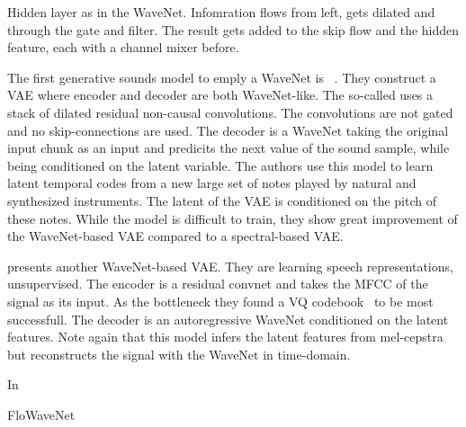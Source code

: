 \begin{marginfigure}
    
    \caption{Hidden layer as in the WaveNet. Infomration flows from left, gets dilated and through the gate and filter. The result gets added to the skip flow and the hidden feature, each with a channel mixer before.}%
    \label{fig:wavenet_layer}
\end{marginfigure}


The first generative sounds model to emply a WaveNet is ~\cite{kalchbrennerEfficient2018}. They construct a VAE where encoder and decoder are both WaveNet-like. The so-called  uses a stack of dilated residual non-causal convolutions. The convolutions are not gated and no skip-connections are used. The decoder is a WaveNet taking the original input chunk as an input and predicits the next value of the sound sample, while being conditioned on the latent variable. The authors use this model to learn latent temporal codes from a new large set of notes played by natural and synthesized instruments. The latent of the VAE is conditioned on the pitch of these notes. While the model is difficult to train, they show great improvement of the WaveNet-based VAE compared to a spectral-based VAE.

\textcite{chorowskiUnsupervised2019} presents another WaveNet-based VAE. They are learning speech representations, unsupervised. The encoder is a residual convnet and takes the MFCC of the signal as its input. As the bottleneck they found a VQ codebook~\cite{vandenoordNeural2017} to be most successfull. The decoder is an autoregressive WaveNet conditioned on the latent features. Note again that this model infers the latent features from mel-cepstra but reconstructs the signal with the WaveNet in time-domain.

In~\cite{prengerWaveGlow2018}

FloWaveNet~\cite{kimFloWaveNet2019a}
